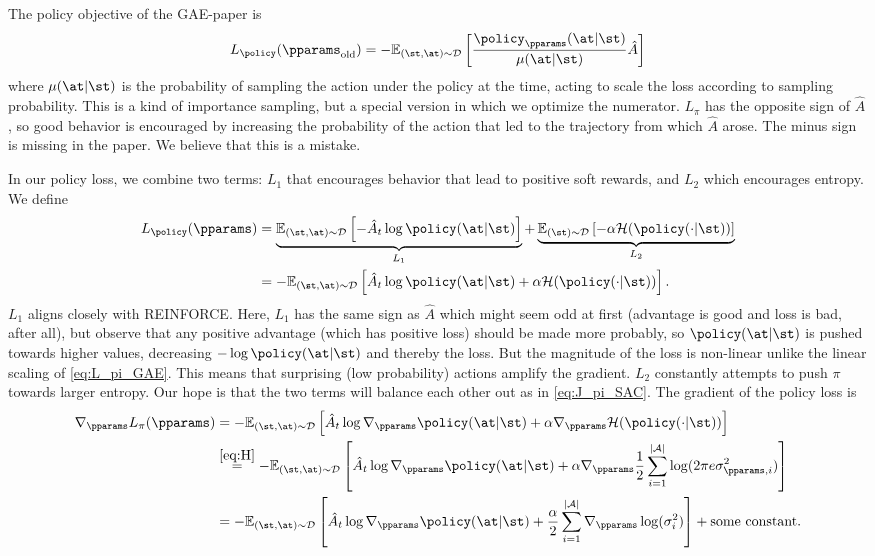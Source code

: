 The policy objective of the GAE-paper is
\begin{align}
    L_\policy(\pparams_\text{old}) = -\mathbb{E}_{(\st, \at) \sim \mathcal{D}} \left[ \frac{\policy_\pparams(\at | \st)}{\mu(\at | \st)} \hat{A} \right] \label{eq:L_pi_GAE}
\end{align}
where \(\mu(\at |\st)\) is the probability of sampling the action under the policy at the time, acting to scale the loss according to sampling probability. This is a kind of importance sampling, but a special version in which we optimize the numerator. \(L_\pi\) has the opposite sign of \(\hat{A}\), so good behavior is encouraged by increasing the probability of the action that led to the trajectory from which \(\hat{A}\) arose. The minus sign is missing in the paper. We believe that this is a mistake.

In our policy loss, we combine two terms: \(L_1\) that encourages behavior that lead to positive soft rewards, and \(L_2\) which encourages entropy. We define
\begin{align}
    L_\policy(\pparams) &= \underbrace{\mathbb{E}_{(\st, \at) \sim \mathcal{D}}\left[- \hat{A}_t \log \policy(\at | \st) \right]}_{L_1}
    + \underbrace{\mathbb{E}_{(\st) \sim \mathcal{D}}\left[- \alpha \mathcal{H}(\policy(\cdot | \st)) \right]}_{L_2} \\
    &= - \mathbb{E}_{(\st, \at) \sim \mathcal{D}}\left[\hat{A}_t \log \policy(\at | \st) + \alpha \mathcal{H}(\policy(\cdot | \st)) \right].
\end{align}
\(L_1\) aligns closely with REINFORCE. Here, \(L_1\) has the same sign as \(\hat{A}\) which might seem odd at first (advantage is good and loss is bad, after all), but observe that any positive advantage (which has positive loss) should be made more probably, so \(\policy(\at |\st)\) is pushed towards higher values, decreasing \(- \log \policy(\at |\st)\) and thereby the loss. But the magnitude of the loss is non-linear unlike the linear scaling of \eqref{eq:L_pi_GAE}. This means that surprising (low probability) actions amplify the gradient. \(L_2\) constantly attempts to push \(\pi\) towards larger entropy. Our hope is that the two terms will balance each other out as in \eqref{eq:J_pi_SAC}. The gradient of the policy loss is
\begin{align}
    \nabla_\pparams L_\pi(\pparams) &= - \mathbb{E}_{(\st, \at) \sim \mathcal{D}}\left[\hat{A}_t \log \nabla_\pparams \policy(\at | \st) + \alpha \nabla_\pparams \mathcal{H}(\policy(\cdot | \st)) \right] \notag \\
    &\overset{\eqref{eq:H}}{=} - \mathbb{E}_{(\st, \at) \sim \mathcal{D}}\left[\hat{A}_t \log \nabla_\pparams \policy(\at | \st) + \alpha \nabla_\pparams \frac{1}{2} \sum_{i=1}^{|\mathcal{A}|}\log(2 \pi e \sigma_{\pparams, i}^2) \right] \notag \\
    &= - \mathbb{E}_{(\st, \at) \sim \mathcal{D}}\left[\hat{A}_t \log \nabla_\pparams \policy(\at | \st) + \frac{\alpha}{2} \sum_{i=1}^{|\mathcal{A}|}\nabla_\pparams \log(\sigma_i^2) \right] + \text{some constant}.
\end{align}

